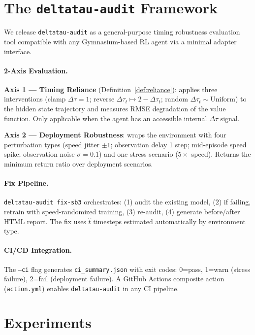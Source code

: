 \documentclass[10pt,twocolumn]{article}
\newcommand{\deltatau}{\Delta\tau}
\theoremstyle{plain}
\theoremstyle{definition}
\begin{document}
\section{The \texttt{deltatau-audit} Framework}
\label{sec:audit}

We release \texttt{deltatau-audit} as a general-purpose timing robustness evaluation
tool compatible with any Gymnasium-based RL agent via a minimal adapter interface.

\paragraph{2-Axis Evaluation.}
\textbf{Axis 1 — Timing Reliance} (Definition~\ref{def:reliance}): applies
three interventions (clamp $\deltatau=1$; reverse $\deltatau_t \mapsto 2-\deltatau_t$;
random $\deltatau_t \sim \mathrm{Uniform}$) to the hidden state trajectory and
measures RMSE degradation of the value function. Only applicable when the agent
has an accessible internal $\deltatau$ signal.

\textbf{Axis 2 — Deployment Robustness}: wraps the environment with four perturbation
types (speed jitter $\pm1$; observation delay 1 step; mid-episode speed spike; observation
noise $\sigma=0.1$) and one stress scenario ($5\times$ speed). Returns the minimum
return ratio over deployment scenarios.

\paragraph{Fix Pipeline.}
\texttt{deltatau-audit fix-sb3} orchestrates: (1) audit the existing model,
(2) if failing, retrain with speed-randomized training, (3) re-audit, (4) generate
before/after HTML report. The fix uses $\hat{t}$ timesteps estimated automatically
by environment type.

\paragraph{CI/CD Integration.}
The \texttt{--ci} flag generates \texttt{ci\_summary.json} with exit codes:
0=pass, 1=warn (stress failure), 2=fail (deployment failure). A GitHub Actions
composite action (\texttt{action.yml}) enables \texttt{deltatau-audit} in any CI pipeline.

\section{Experiments}
\label{sec:experiments}
\end{document}
